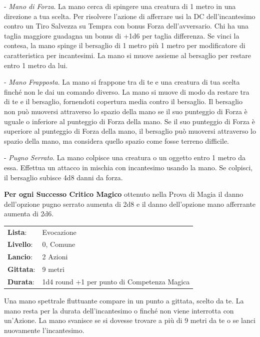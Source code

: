 \begin{multicols}{2}
- \emph{Mano di Forza}. La mano cerca di spingere una creatura di 1 metro in una direzione a tua scelta. Per risolvere l'azione di afferrare usi la DC dell'incantesimo contro un Tiro Salvezza su Tempra con bonus Forza dell'avversario. Chi ha una taglia maggiore guadagna un bonus di +1d6 per taglia differenza.
Se vinci la contesa, la mano spinge il bersaglio di 1 metro più 1 metro per modificatore di caratteristica per incantesimi. La mano si muove assieme al bersaglio per restare entro 1 metro da lui.

- \emph{Mano Frapposta}. La mano si frappone tra di te e una creatura di tua scelta finché non le dai un comando diverso. La mano si muove di modo da restare tra di te e il bersaglio, fornendoti copertura media contro il bersaglio. Il bersaglio non può muoversi attraverso lo spazio della mano se il suo punteggio di Forza è uguale o inferiore al punteggio di Forza della mano. Se il suo punteggio di Forza è superiore al punteggio di Forza della mano, il bersaglio può muoversi attraverso lo spazio della mano, ma considera quello spazio come fosse terreno difficile.

- \emph{Pugno Serrato}. La mano colpisce una creatura o un oggetto entro 1 metro da essa. Effettua un attacco in mischia con incantesimo usando la mano. Se colpisci, il bersaglio subisce 4d8 danni da forza.

\textbf{Per ogni Successo Critico Magico} ottenuto nella Prova di Magia il danno dell'opzione pugno serrato aumenta di 2d8 e il danno dell'opzione mano afferrante aumenta di 2d6.

\noindent\begin{tabularx}{\linewidth}{p{1.3cm}X}
	\rowcolor{gray!20}\textbf{Lista}: & Evocazione \\
	\textbf{Livello}: & 0, Comune \\
	\rowcolor{gray!20}\textbf{Lancio}: & 2 Azioni \\
	\textbf{Gittata}: & 9 metri \\
	\rowcolor{gray!20}\textbf{Durata}: & 1d4 round +1 per punto di Competenza Magica \\
\end{tabularx}\smallskip

Una mano spettrale fluttuante compare in un punto a gittata, scelto da te. La mano resta per la durata dell'incantesimo o finché non viene interrotta con un'Azione. La mano svanisce se si dovesse trovare a più di 9 metri da te o se lanci nuovamente l'incantesimo.


\end{multicols}
